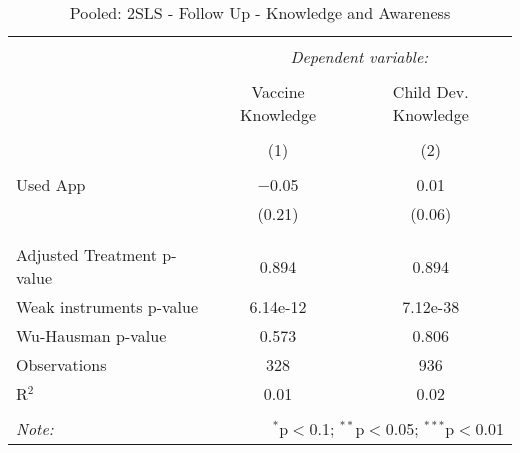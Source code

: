 
\begin{table}[!htbp] \centering 
  \caption{Pooled: 2SLS - Follow Up - Knowledge and Awareness} 
  \label{tbl:Pooled: 2SLS - Follow Up - Knowledge and Awareness} 
\begin{tabular}{@{\extracolsep{5pt}}lcc} 
\\[-1.8ex]\hline 
\hline \\[-1.8ex] 
 & \multicolumn{2}{c}{\textit{Dependent variable:}} \\ 
\cline{2-3} 
\\[-1.8ex] & Vaccine Knowledge & Child Dev. Knowledge \\ 
\\[-1.8ex] & (1) & (2)\\ 
\hline \\[-1.8ex] 
 Used App & $-$0.05 & 0.01 \\ 
  & (0.21) & (0.06) \\ 
  & & \\ 
\hline \\[-1.8ex] 
Adjusted Treatment p-value & 0.894 & 0.894 \\ 
Weak instruments p-value & 6.14e-12 & 7.12e-38 \\ 
Wu-Hausman p-value & 0.573 & 0.806 \\ 
Observations & 328 & 936 \\ 
R$^{2}$ & 0.01 & 0.02 \\ 
\hline 
\hline \\[-1.8ex] 
\textit{Note:}  & \multicolumn{2}{r}{$^{*}$p$<$0.1; $^{**}$p$<$0.05; $^{***}$p$<$0.01} \\ 
\end{tabular} 
\end{table} 
